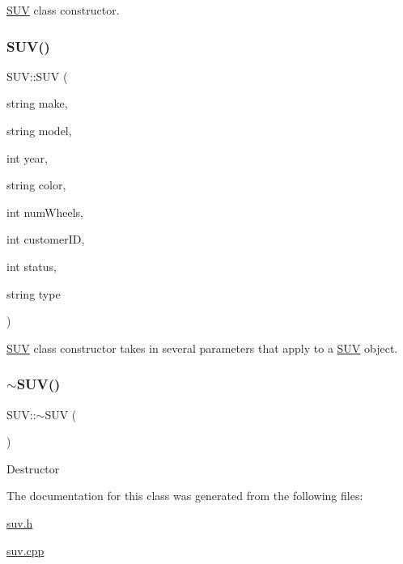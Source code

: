 \hyperlink{class_s_u_v}{S\+UV} class constructor. \mbox{\label{class_s_u_v_a221a9726b31f7e69f4e746624d0ea50e}} 
\subsubsection{\texorpdfstring{S\+U\+V()}{SUV()}\hspace{0.1cm}{\footnotesize\ttfamily [2/2]}}
{\footnotesize\ttfamily S\+U\+V\+::\+S\+UV (\begin{DoxyParamCaption}\item[{string}]{make,  }\item[{string}]{model,  }\item[{int}]{year,  }\item[{string}]{color,  }\item[{int}]{num\+Wheels,  }\item[{int}]{customer\+ID,  }\item[{int}]{status,  }\item[{string}]{type }\end{DoxyParamCaption})}

\hyperlink{class_s_u_v}{S\+UV} class constructor takes in several parameters that apply to a \hyperlink{class_s_u_v}{S\+UV} object. \mbox{\label{class_s_u_v_abcf2fe9b86e78678fd634598f4b3c738}} 
\subsubsection{\texorpdfstring{$\sim$\+S\+U\+V()}{~SUV()}}
{\footnotesize\ttfamily S\+U\+V\+::$\sim$\+S\+UV (\begin{DoxyParamCaption}{ }\end{DoxyParamCaption})}

Destructor 

The documentation for this class was generated from the following files\+:\begin{DoxyCompactItemize}
\item 
\hyperlink{suv_8h}{suv.\+h}\item 
\hyperlink{suv_8cpp}{suv.\+cpp}\end{DoxyCompactItemize}

